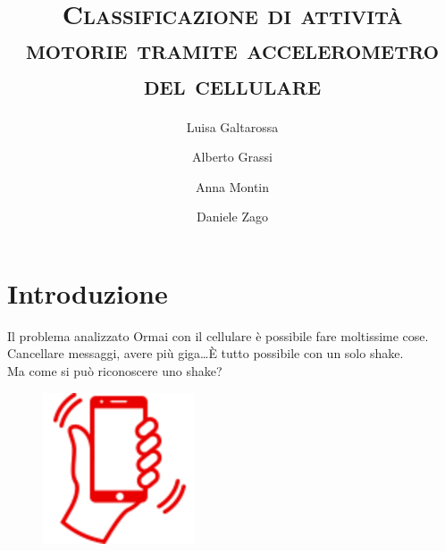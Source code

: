 \documentclass{beamer}
\title{\textsc{Classificazione di attività motorie tramite accelerometro del cellulare}}
\author{Luisa Galtarossa\and Alberto Grassi\and Anna Montin\and Daniele Zago}
\date{}
\begin{document}
\begin{frame}
\titlepage
\end{frame}

\section{Introduzione}
\begin{frame}{Il problema analizzato}
Ormai con il cellulare è possibile fare moltissime cose. 
Cancellare messaggi, avere più giga\dots È tutto possibile con un solo shake.\\
\smallskip
Ma come si può riconoscere uno shake?
\medskip
\begin{figure}[H]
\includegraphics[width=0.4\textwidth]{./images/vodafoneshake.png}
\end{figure}
\end{frame}
\end{document}
